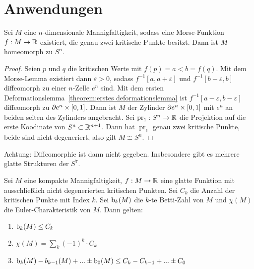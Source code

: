 \section{Anwendungen}

\begin{theorem}
    \label{theorem:Sn}
    Sei $M$ eine $n$-dimensionale Mannigfaltigkeit, sodass eine Morse-Funktion
    $f: M \to { \mathbb R }$ existiert, die genau zwei kritische Punkte besitzt.
    Dann ist $M$ homeomorph zu $S^n$.
\end{theorem}

\begin{proof}
    Seien $p$ und $q$ die kritischen Werte mit $f(p) = a < b = f(q)$. Mit dem 
    Morse-Lemma existiert dann $\varepsilon > 0$, sodass 
    $f^{-1}[a, a + \varepsilon]$ und $f^{-1}[b - \varepsilon, b]$ diffeomorph
    zu einer $n$-Zelle $e^n$ sind. 
    Mit dem ersten Deformationslemma~\ref{theorem:erstes deformationslemma} ist
    $f^{-1}[a - \varepsilon, b - \varepsilon]$ diffeomorph zu 
    ${ \partial } e^n \times [0, 1]$. Dann ist $M$ der Zylinder ${ \partial } e^n \times [0, 1]$ 
    mit $e^n$ an beiden seiten des Zylinders angebracht. Sei 
    $\operatorname{pr}_1: S^n \to { \mathbb R }$ die Projektion auf die erste Koodinate von
    $S^n \subset { \mathbb R }^{n + 1}$. Dann hat $\operatorname{pr}_1$ genau zwei kritische 
    Punkte, beide sind nicht degeneriert, also gilt $M \cong S^n$.
\end{proof}

Achtung: Diffeomorphie ist dann nicht gegeben. Insbesondere gibt es mehrere glatte
Strukturen der $S^7$.

\begin{theorem}
    Sei $M$ eine kompakte Mannigfaltigkeit, $f: M \to { \mathbb R }$ eine glatte Funktion
    mit ausschließlich nicht degenerierten kritischen Punkten. Sei $C_k$ die
    Anzahl der kritischen Punkte mit Index $k$. Sei ${ \operatorname{b} }_k(M)$ die $k$-te 
    Betti-Zahl von $M$ und $\chi(M)$ die Euler-Charakteristik von $M$. 
    Dann gelten:
    \begin{enumerate}
        \item $ { \operatorname{b} }_k(M) \leq C_k $ 
        \item $ \chi(M) = \sum_k (-1)^k \cdot C_k $
        \item $ { \operatorname{b} }_k(M) - b_{k - 1}(M) + ... \pm { \operatorname{b} }_0(M) 
            \leq C_k - C_{k-1} + ... \pm C_0 $
    \end{enumerate}
\end{theorem}

